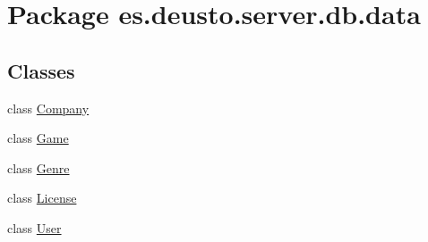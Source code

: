 \hypertarget{namespacees_1_1deusto_1_1server_1_1db_1_1data}{}\section{Package es.\+deusto.\+server.\+db.\+data}
\label{namespacees_1_1deusto_1_1server_1_1db_1_1data}
\subsection*{Classes}
\begin{DoxyCompactItemize}
\item 
class \hyperlink{classes_1_1deusto_1_1server_1_1db_1_1data_1_1_company}{Company}
\item 
class \hyperlink{classes_1_1deusto_1_1server_1_1db_1_1data_1_1_game}{Game}
\item 
class \hyperlink{classes_1_1deusto_1_1server_1_1db_1_1data_1_1_genre}{Genre}
\item 
class \hyperlink{classes_1_1deusto_1_1server_1_1db_1_1data_1_1_license}{License}
\item 
class \hyperlink{classes_1_1deusto_1_1server_1_1db_1_1data_1_1_user}{User}
\end{DoxyCompactItemize}
